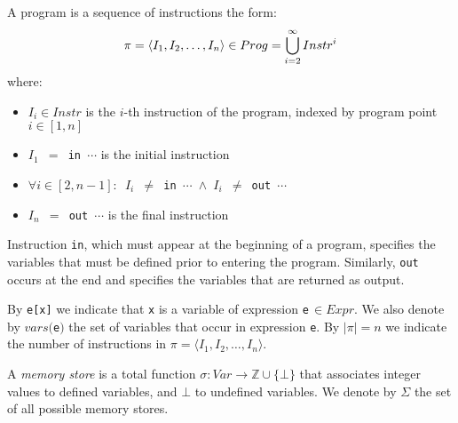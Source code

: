 

\begin{definition}[Program]
\label{de:program}
A program is a sequence of instructions the form:
\vspace{-3mm}
\begin{equation*}
\pi=\langle I_1, I_2, \ldots, I_n \rangle\in Prog = \bigcup_{i=2}^{\infty} Instr^{i}
\vspace{-4mm}
\end{equation*}
where: 

\begin{itemize}[itemsep=3pt,parsep=0pt,topsep=3pt]
\item \texttt{$I_i\in Instr$} is the $i$-th instruction of the program, indexed by program point \texttt{$i\in[1,n]$}
\item \texttt{$I_1$ $=$ in $\cdots$} is the initial instruction
\item \texttt{$\forall i\in[2,n-1]:$ $I_i$ $\neq$ in $\cdots$ $\wedge$ $I_i$ $\neq$ out $\cdots$}
\item \texttt{$I_n$ $=$ out $\cdots$} is the final instruction
\end{itemize}
\end{definition}

\noindent Instruction \texttt{in}, which must appear at the beginning of a program, specifies the variables that must be defined prior to entering the program. Similarly, \texttt{out} occurs at the end and specifies the variables that are returned as output. 

By \texttt{e[x]} we indicate that \texttt{x} is a variable of expression \texttt{e}\,$\in Expr$. We also denote by $vars($\texttt{e}$)$ the set of variables that occur in expression \texttt{e}. By $|\pi|=n$ we indicate the number of instructions in $\pi=\langle I_1, I_2, \ldots, I_n \rangle$.

\begin{definition}
A {\em memory store} is a total function $\sigma:Var\rightarrow \mathbb{Z}\cup\{\bot\}$ that associates integer values to defined variables, and $\bot$ to undefined variables. We denote by $\Sigma$ the set of all possible memory stores. 
\end{definition}

